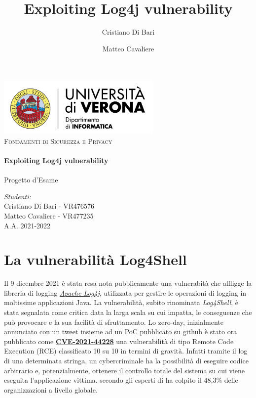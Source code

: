 \documentclass[a4paper, 12pt]{article}
\title{Exploiting Log4j vulnerability}
\author{Cristiano Di Bari}
\author{Matteo Cavaliere}
\begin{document}
\begin{titlepage}
    \vbox{ }

    \begin{center}
        \includegraphics[width=0.60\textwidth]{img/univr-di-logo.png}\\[2cm]
        \textsc{\Large Fondamenti di Sicurezza e Privacy}\\[0.6cm]

        \noindent\makebox[\linewidth]{\rule{.7\paperwidth}{.6pt}}\\[0.7cm]
        { \huge \bfseries Exploiting Log4j vulnerability}\\[0.25cm]
        \noindent\makebox[\linewidth]{\rule{.7\paperwidth}{.6pt}}\\[0.7cm]
        \large{Progetto d'Esame}\\[1.2cm]
        \vfill
        \large
        
        \emph{Studenti:}\\[1mm]
        Cristiano Di Bari  - VR476576  \\[1mm]
        Matteo Cavaliere - VR477235  \\[2cm]

        {\large A.A. 2021-2022}
    \end{center}
\end{titlepage}

\tableofcontents
\newpage

\section{La vulnerabilità Log4Shell}
Il 9 dicembre 2021 è stata resa nota pubblicamente una vulnerabità che affligge la libreria di logging \emph{\href{https://logging.apache.org/log4j/2.x/}{Apache Log4j}}, utilizzata per gestire le operazioni di logging in moltissime applicazioni Java.
La vulnerabilità, subito rinominata \emph{Log4Shell}, è stata segnalata come critica data la larga scala su cui impatta, le conseguenze che può provocare e la sua facilità di sfruttamento.
Lo zero-day, inizialmente annunciato con un tweet insieme ad un PoC pubblicato su github è stato ora pubblicato come \textbf{\href{https://nvd.nist.gov/vuln/detail/CVE-2021-44228}{CVE-2021-44228}}  una vulnerabilità di tipo Remote Code Execution (RCE) classificato 10 su 10 in termini di gravità. Infatti tramite il log di una determinata stringa, un cybercriminale ha la possibilità di eseguire codice arbitrario e, potenzialmente, ottenere il controllo totale del sistema su cui viene eseguita l'applicazione vittima.
 secondo gli esperti di  ha colpito il 48,3\% delle organizzazioni a livello globale. 
\end{document}
